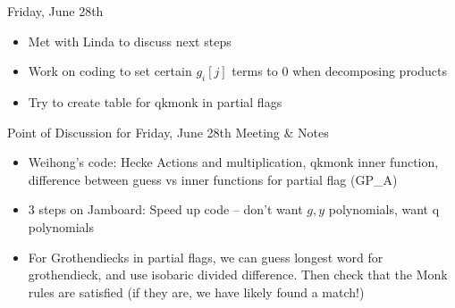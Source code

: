 Friday, June 28th
\begin{itemize}
    \item Met with Linda to discuss next steps
    \item Work on coding to set certain $g_i[j]$ terms to $0$ when decomposing products
    \item Try to create table for qkmonk in partial flags
\end{itemize}

Point of Discussion for Friday, June 28th Meeting \& Notes
\begin{itemize}
    \item Weihong's code: Hecke Actions and multiplication, qkmonk inner function, difference between guess vs inner functions for partial flag (GP\_A)
    \item 3 steps on Jamboard: Speed up code -- don't want $g, y$ polynomials, want q polynomials
    \item For Grothendiecks in partial flags, we can guess longest word for grothendieck, and use isobaric divided difference. Then check that the Monk rules are satisfied (if they are, we have likely found a match!)
\end{itemize}